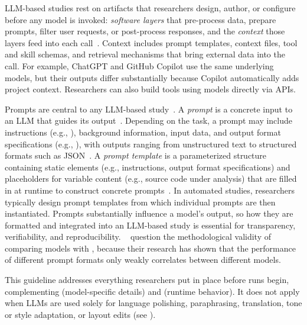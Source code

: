 
LLM-based studies rest on artifacts that researchers design, author, or configure before any model is invoked: \emph{software layers} that pre-process data, prepare prompts, filter user requests, or post-process responses, and the \emph{context} those layers feed into each call~\cite{galster2026configuring}. Context includes prompt templates, context files, tool and skill schemas, and retrieval mechanisms that bring external data into the call.
For example, ChatGPT and GitHub Copilot use the same underlying models, but their outputs differ substantially because Copilot automatically adds project context. Researchers can also build tools using models directly via APIs.

Prompts are central to any LLM-based study~\cite{DBLP:conf/iclr/Sclar0TS24}.
A \emph{prompt} is a concrete input to an LLM that guides its output~\cite{DBLP:journals/corr/abs-2406-06608}.
Depending on the task, a prompt may include instructions (e.g., ), background information, input data, and output format specifications (e.g., ), with outputs ranging from unstructured text to structured formats such as JSON~\cite{promptingguide_elements}.
A \emph{prompt template} is a parameterized structure containing static elements (e.g., instructions, output format specifications) and placeholders for variable content (e.g., source code under analysis) that are filled in at runtime to construct concrete prompts~\cite{DBLP:journals/corr/abs-2406-06608}.
In automated studies, researchers typically design prompt templates from which individual prompts are then instantiated.
Prompts substantially influence a model's output, so how they are formatted and integrated into an LLM-based study is essential for transparency, verifiability, and reproducibility.
\citeauthor{DBLP:conf/iclr/Sclar0TS24}~\cite{DBLP:conf/iclr/Sclar0TS24} question the methodological validity of comparing models with , because their research has shown that the performance of different prompt formats only weakly correlates between different models.

This guideline addresses everything researchers put in place before runs begin, complementing \modelversion (model-specific details) and \traces (runtime behavior).
It does not apply when LLMs are used solely for language polishing, paraphrasing, translation, tone or style adaptation, or layout edits (see \scope).

